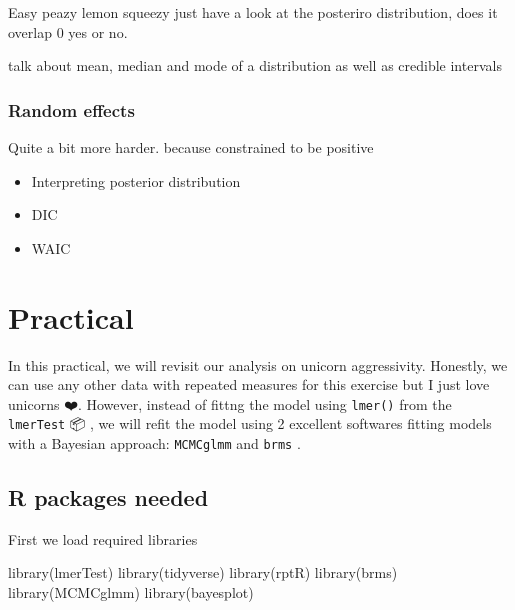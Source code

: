 \documentclass[
  12pt,
]{book}
\newenvironment{Shaded}{\begin{snugshade}}{\end{snugshade}}
\newcommand{\FunctionTok}[1]{\textcolor[rgb]{0.00,0.00,0.00}{#1}}
\newcommand{\NormalTok}[1]{#1}
\providecommand{\tightlist}{%
  \setlength{\itemsep}{0pt}\setlength{\parskip}{0pt}}
\begin{document}
Easy peazy lemon squeezy just have a look at the posteriro distribution, does it overlap 0 yes or no.

talk about mean, median and mode of a distribution as well as credible intervals

\hypertarget{random-effects-1}{%
\subsubsection{Random effects}\label{random-effects-1}}

Quite a bit more harder. because constrained to be positive

\begin{itemize}
\tightlist
\item
  Interpreting posterior distribution
\item
  DIC
\item
  WAIC
\end{itemize}

\hypertarget{practical-4}{%
\section{Practical}\label{practical-4}}

In this practical, we will revisit our analysis on unicorn aggressivity.
Honestly, we can use any other data with repeated measures for this exercise
but I just love unicorns ❤️.
However, instead of fittng the model using \texttt{lmer()} from the \texttt{lmerTest}
📦 \citep{R-lmerTest}, we will refit the model using 2 excellent
softwares fitting models with a Bayesian approach: \texttt{MCMCglmm} \citep{MCMCglmm2010} and
\texttt{brms} \citep{R-brms}.

\hypertarget{r-packages-needed-1}{%
\subsection{R packages needed}\label{r-packages-needed-1}}

First we load required libraries

\begin{Shaded}
\begin{Highlighting}[]
\FunctionTok{library}\NormalTok{(lmerTest)}
\FunctionTok{library}\NormalTok{(tidyverse)}
\FunctionTok{library}\NormalTok{(rptR)}
\FunctionTok{library}\NormalTok{(brms)}
\FunctionTok{library}\NormalTok{(MCMCglmm)}
\FunctionTok{library}\NormalTok{(bayesplot)}
\end{Highlighting}
\end{Shaded}
\end{document}
